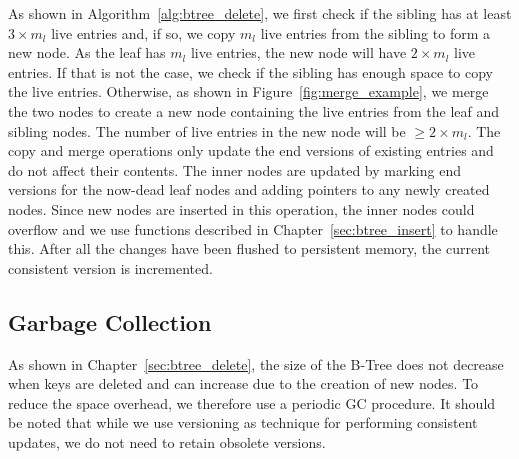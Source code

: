 As shown in Algorithm~\ref{alg:btree_delete}, we first check if the
sibling has at least $3\times m_{l}$ live entries and, if so, we copy
$m_{l}$ live entries from the sibling to form a new node. As the leaf
has $m_{l}$ live entries, the new node will have $2\times m_{l}$ live
entries. If that is not the case, we check if the sibling has enough
space to copy the live entries. Otherwise, as shown in
Figure~\ref{fig:merge_example}, we merge the two nodes to create a new
node containing the live entries from the leaf and sibling
nodes. The number of live entries in the new node will be $\geq 2
\times m_{l}$. The copy and merge operations only update the end
versions of existing entries and do not affect their contents.
The inner nodes are updated by marking end versions for the now-dead leaf
nodes and adding pointers to any newly created nodes. Since new nodes
are inserted in this operation, the inner nodes could overflow and
we use functions described in Chapter~\ref{sec:btree_insert} to
handle this.  After all the changes have been flushed to persistent
memory, the current consistent version is incremented.


\subsection{Garbage Collection}
\label{sec:gc}

As shown in Chapter~\ref{sec:btree_delete}, the size of the B-Tree
does not decrease when keys are deleted and can increase due to the
creation of new nodes.  To reduce the space overhead, we therefore use
a periodic GC procedure. It should be noted that while we use 
versioning as technique for performing consistent updates, we do
not need to retain obsolete versions. 

